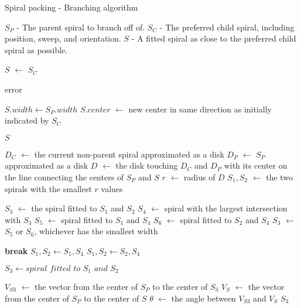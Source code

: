 \begin{algorithm*}
\caption{Spiral packing - Branching algorithm}
\label{alg:branch}
\scriptsize
\begin{algorithmic}[1]
	\Require $S_{P}$ - The parent spiral to branch off of.
	\Require $S_{C}$ - The preferred child spiral, including position, sweep, and orientation.
	\Ensure $S$ - A fitted spiral as close to the preferred child spiral as possible.
		
		\State $S$ $\gets$ $S_{C}$
		\State
			
			\State \Return error
		\EndIf
		\State
      
			\State $S.width \gets S_{P}.width$
			\State $S.center$ $\gets$ new center in same direction as initially indicated by $S_{C}$
		\EndIf
		\State
			
			\State \Return $S$
		\EndIf
		\State
			
				\State $D_{C}$ $\gets$ the current non-parent spiral approximated as a disk
				\State $D_{P}$ $\gets$ $S_{P}$ approximated as a disk
				\State $D$ $\gets$ the disk touching $D_{C}$ and $D_{P}$ with its center	on the
				\State \hskip 10mm  line connecting the centers of $S_{P}$ and $S$
				\State $r$ $\gets$ radius of $D$
				\State $S_{1}, S_{2}$ $\gets$ the two spirals with the smallest $r$ values
			\EndFor
			\State

			\State $S_{3}$ $\gets$ the spiral fitted to $S_{1}$ and $S_{2}$
				\State $S_{4}$ $\gets$ spiral with the largest intersection with $S_{3}$
				\State $S_{5}$ $\gets$ spiral fitted to $S_{1}$ and $S_{4}$
				\State $S_{6}$ $\gets$ spiral fitted to $S_{2}$ and $S_{4}$
				\State $S_{3}$ $\gets$ $S_{5}$ or $S_{6}$, whichever has the smallest width
				\State
					
					\State \textbf{break}
				\Else {}
					\State $S_{1}, S_{2} \gets S_{1}, S_{4}$
				\Else
					\State $S_{1}, S_{2} \gets S_{2}, S_{4}$
				\EndIf
				\State
						
				\State $S_{3} \gets \textit{spiral fitted to $S_{1}$ and $S_{2}$}$
				\EndIf
			\EndWhile
			\State
				
			\State $V_{S3}$ $\gets$ the vector from the center of $S_{P}$ to the center of $S_{3}$
			\State $V_{S}$ $\gets$ the vector from the center of $S_{P}$ to the center of $S$
			\State $\theta$ $\gets$ the angle between $V_{S3}$ and $V_{S}$
			\If{$\theta \leq 12.5\degree$}
				\State \Return $S_{3}$
			\EndIf
		\EndIf
		\State
		

\end{algorithmic}
\end{algorithm*}
